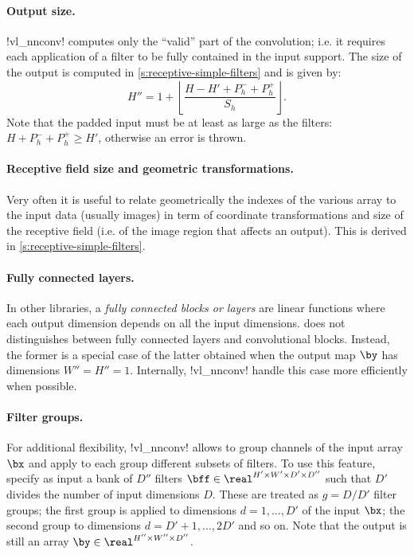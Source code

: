 \paragraph{Output size.} !vl_nnconv! computes only the ``valid'' part of the convolution; i.e. it requires each application of a filter to be fully contained in the input support.  The size of the output is computed in \autoref{s:receptive-simple-filters} and is given by:
\[
  H'' = 1 + \left\lfloor \frac{H - H' + P_h^- + P_h^+}{S_h} \right\rfloor.
\]
Note that the padded input must be at least as large as the filters: $H +P_h^- + P_h^+ \geq H'$, otherwise an error is thrown.

\paragraph{Receptive field size and geometric transformations.} Very often it is useful to relate geometrically the indexes of the various array to the input data (usually images) in term of coordinate transformations and size of the receptive field (i.e. of the image region that affects an output). This is derived in \autoref{s:receptive-simple-filters}.

\paragraph{Fully connected layers.} In other libraries, a \emph{fully connected blocks or layers} are linear functions where each output dimension depends on all the input dimensions. \matconvnet does not distinguishes between fully connected layers and convolutional blocks. Instead, the former is a special case of the latter obtained when the output map $\by$ has dimensions $W''=H''=1$. Internally, !vl_nnconv! handle this case more efficiently when possible.

\paragraph{Filter groups.} For additional flexibility, !vl_nnconv! allows to group channels of the input array $\bx$ and apply to each group different subsets of filters. To use this feature, specify as input a bank  of $D''$ filters $\bff\in\real^{H'\times W'\times D'\times D''}$ such that $D'$ divides the number of input dimensions $D$. These are treated as $g=D/D'$ filter groups; the first group is applied to dimensions $d=1,\dots,D'$ of the input $\bx$; the second group to dimensions $d=D'+1,\dots,2D'$ and so on. Note that the output is still an array $\by\in\real^{H''\times W''\times D''}$.

